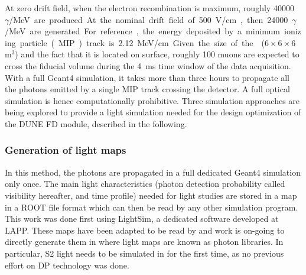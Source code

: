 At zero drift field, when the electron recombination is maximum, roughly \SI{40000}{$\gamma$/MeV} are produced. At the nominal drift field of \SI{500}{V/cm}, then \num{24000}{$\gamma$/MeV} are generated. For reference, the energy deposited by a minimum ionizing particle (MIP) track is \SI{2.12}{MeV/cm}. Given the size of the  ($6\times6\times6$\,m$^3$) and the fact that it is located on surface, roughly \num{100} muons are expected to cross the fiducial volume during the \SI{4}{ms} time window of the data acquisition. With a full Geant4 \cite{geant4} simulation, it takes more than three hours to propagate all the photons emitted by a single MIP track crossing the  detector. A full optical simulation is hence computationally prohibitive. Three simulation approaches are being explored to provide a light simulation needed for the design optimization of the DUNE FD module, described in the following.


\subsubsection{Generation of light maps}
\label{subsec:fddp-pd-6.1.1}

In this method, the photons are propagated in a full dedicated Geant4 simulation only once. The main light characteristics (photon detection probability called visibility hereafter, and time profile) needed for light studies are stored in a map in a ROOT \cite{root} file format which can then be read by any other simulation program. This work was done first using LightSim, a dedicated software developed at LAPP. These maps have been adapted to be read by \larsoft and work is on-going to directly generate them in \larsoft where light maps are known as photon libraries. In particular, S2 light needs to be simulated in \larsoft for the first time, as no previous effort on DP technology was done.

